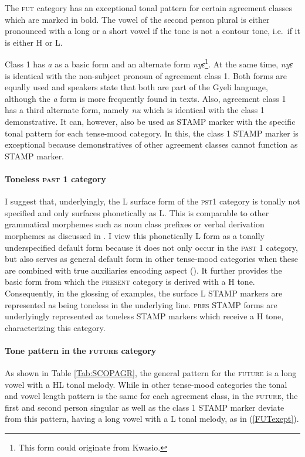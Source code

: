 \noindent The \textsc{fut} category has an exceptional tonal pattern for certain agreement classes which are marked in bold. The vowel of the second person plural is either pronounced with a long or a short vowel if the tone is not a contour tone, i.e.\ if it is either H or L. 

Class 1 has {\itshape a} as a basic form and an alternate form {\itshape nyɛ}\footnote{This form could originate from Kwasio.}. At the same time, {\itshape nyɛ} is identical with the non-subject pronoun of agreement class 1. Both forms are equally used and speakers state that both are part of the Gyeli language, although the {\itshape a} form is more frequently found in texts.  Also, agreement class 1 has a third alternate form, namely {\itshape nu} which is identical with the class 1 demonstrative. It can, however, also be used as STAMP marker with the specific tonal pattern for each tense-mood category. In this, the class 1 STAMP marker is exceptional because demonstratives of other agreement classes cannot function as STAMP marker.

\paragraph{Toneless \textsc{past 1} category} I suggest that, underlyingly, the L surface form of the \textsc{pst1} category is tonally not specified and only surfaces phonetically as L. This is comparable to other grammatical morphemes such as noun class prefixes or verbal derivation morphemes as discussed in . I view this phonetically L form as a tonally underspecified default form because it does not only occur in the \textsc{past 1} category, but also serves as general default form in other tense-mood categories when these are combined with true auxiliaries encoding aspect (). It further provides the basic form from which the \textsc{present} category is derived with a H tone. Consequently, in the glossing of examples, the surface L STAMP markers are represented as being toneless in the underlying line. \textsc{pres} STAMP forms are underlyingly represented as toneless STAMP markers which receive a H tone, characterizing this category.


\paragraph{Tone pattern in the \textsc{future} category} 
As shown in Table \ref{Tab:SCOPAGR}, the general pattern for the \textsc{future} is a long vowel with a HL tonal melody. While in other tense-mood categories the tonal and vowel length pattern is the same for each agreement class, in the \textsc{future}, the first and second person singular as well as the class 1 STAMP marker deviate from this pattern, having a long vowel with a L tonal melody, as in (\ref{FUTexept}). 


